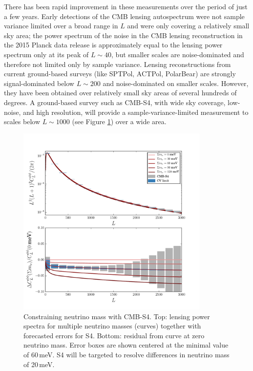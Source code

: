 There has been rapid improvement in these measurements over the period of just a few years. 
Early detections of the CMB lensing autospectrum were not sample variance limited over a broad range in $L$ and were only covering a relatively small sky area;  
the  power spectrum of the noise in the CMB lensing reconstruction  in the 2015 Planck data release is approximately equal to the lensing power spectrum only at its peak of $L \sim 40$, but smaller scales are noise-dominated and therefore not limited only by sample variance.  Lensing reconstructions from current ground-based surveys (like SPTPol, ACTPol, PolarBear) 
are strongly signal-dominated below $L \sim 200$ and noise-dominated on smaller scales.  However, they have been obtained over relatively small sky areas of several hundreds of degrees. A ground-based survey such as CMB-S4, with wide sky coverage, low-noise, and high resolution, will provide a sample-variance-limited measurement to scales below $L \sim 1000$ (see Figure \ref{Neutrinos}) over a wide area.  
 


\begin{figure}[htbp]
\centering
\includegraphics[width=0.85\textwidth]{CMBLensing/s4errors.pdf}
\caption{Constraining neutrino mass with CMB-S4.  Top: lensing power spectra for multiple neutrino masses (curves) together with forecasted errors for S4.  Bottom: residual from curve at zero neutrino mass.  Error boxes are shown centered at the minimal value of $60$\,meV.  S4 will be targeted to resolve differences in neutrino mass of 20\,meV. }
\label{Neutrinos}
\end{figure}

